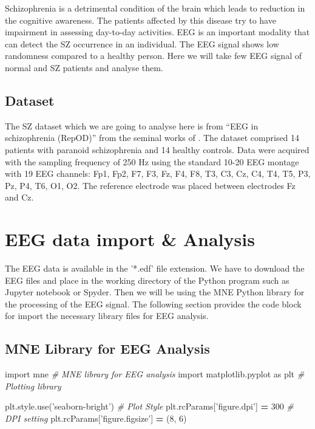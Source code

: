 \documentclass[]{book}
\newenvironment{Shaded}{\begin{snugshade}}{\end{snugshade}}
\newcommand{\CommentTok}[1]{\textcolor[rgb]{0.56,0.35,0.01}{\textit{#1}}}
\newcommand{\DecValTok}[1]{\textcolor[rgb]{0.00,0.00,0.81}{#1}}
\newcommand{\ImportTok}[1]{#1}
\newcommand{\NormalTok}[1]{#1}
\newcommand{\OperatorTok}[1]{\textcolor[rgb]{0.81,0.36,0.00}{\textbf{#1}}}
\newcommand{\StringTok}[1]{\textcolor[rgb]{0.31,0.60,0.02}{#1}}
\begin{document}
Schizophrenia is a detrimental condition of the brain which leads to reduction in the cognitive awareness. The patients affected by this disease try to have impairment in assessing day-to-day activities. EEG is an important modality that can detect the SZ occurrence in an individual. The EEG signal shows low randomness compared to a healthy person. Here we will take few EEG signal of normal and SZ patients and analyse them.

\hypertarget{dataset}{%
\section{Dataset}\label{dataset}}

The SZ dataset which we are going to analyse here is from ``EEG in schizophrenia (RepOD)'' from the seminal works of \citep{eeg-in-schizophrenia}. The dataset comprised 14 patients with paranoid schizophrenia and 14 healthy controls. Data were acquired with the sampling frequency of 250 Hz using the standard 10-20 EEG montage with 19 EEG channels: Fp1, Fp2, F7, F3, Fz, F4, F8, T3, C3, Cz, C4, T4, T5, P3, Pz, P4, T6, O1, O2. The reference electrode was placed between electrodes Fz and Cz. ~

\hypertarget{eeg-data-import-analysis}{%
\chapter{EEG data import \& Analysis}\label{eeg-data-import-analysis}}

The EEG data is available in the '*.edf' file extension. We have to download the EEG files and place in the working directory of the Python program such as Jupyter notebook or Spyder. Then we will be using the MNE Python library for the processing of the EEG signal. The following section provides the code block for import the necessary library files for EEG analysis.

\hypertarget{mne-library-for-eeg-analysis}{%
\section{MNE Library for EEG Analysis}\label{mne-library-for-eeg-analysis}}

\begin{Shaded}
\begin{Highlighting}[]
\ImportTok{import}\NormalTok{ mne }\CommentTok{# MNE library for EEG analysis}
\ImportTok{import}\NormalTok{ matplotlib.pyplot }\ImportTok{as}\NormalTok{ plt }\CommentTok{# Plotting library}

\NormalTok{plt.style.use(}\StringTok{'seaborn-bright'}\NormalTok{) }\CommentTok{# Plot Style}
\NormalTok{plt.rcParams[}\StringTok{'figure.dpi'}\NormalTok{] }\OperatorTok{=} \DecValTok{300} \CommentTok{# DPI setting}
\NormalTok{plt.rcParams[}\StringTok{'figure.figsize'}\NormalTok{] }\OperatorTok{=}\NormalTok{ (}\DecValTok{8}\NormalTok{, }\DecValTok{6}\NormalTok{)}
\end{Highlighting}
\end{Shaded}
\end{document}
